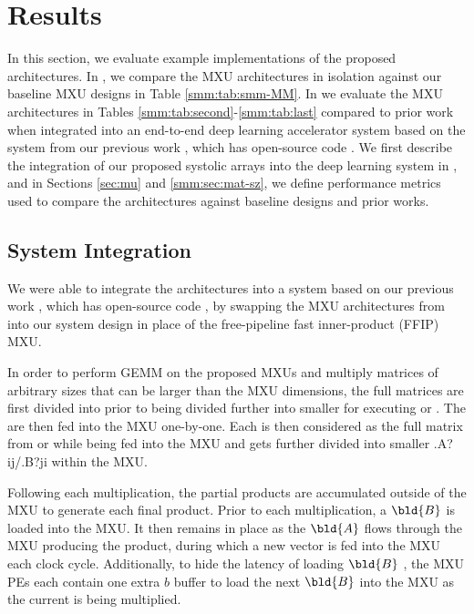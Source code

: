 \section{Results}


In this section, we evaluate example implementations of the proposed \smm architectures.
In , we compare the \smm MXU architectures in isolation against our baseline MXU designs in Table \ref{smm:tab:smm-MM}.
In  we evaluate the \smm MXU architectures in Tables \ref{smm:tab:second}-\ref{smm:tab:last} compared to prior work when integrated into an end-to-end deep learning accelerator system based on the system from our previous work \cite{pogue2024fast}, which has open-source code \cite{ffip-source}.
We first describe the integration of our proposed systolic arrays into the deep learning system in , and in Sections \ref{sec:mu} and \ref{smm:sec:mat-sz}, we define performance metrics used to compare the \smmArch architectures against baseline designs and prior works.

\subsection{System Integration}
\label{sec:system}
We were able to integrate the \smm architectures into a system based on our previous work \cite{pogue2024fast}, which has open-source code \cite{ffip-source}, by swapping the \smmArch MXU architectures from  into our system design \cite{pogue2024fast} in place of the free-pipeline fast inner-product (FFIP) MXU.

In order to perform GEMM on the proposed MXUs and multiply matrices of arbitrary sizes that can be larger than the MXU dimensions, the full \AB matrices are first divided into \gemmtiles prior to being divided further into smaller \blocks for executing  or \seq.
The \gemmtiles are then fed into the MXU one-by-one.
Each \gemmtile is then considered as the full \AB matrix from  or \seq while being fed into the MXU and gets further divided into smaller \m.A?{ij}/\m.B?{ji} \blocks within the MXU.

Following each \gemmtile multiplication, the partial \gemmtile products are accumulated outside of the MXU to generate each final \gemmtile product.
Prior to each \gemmtile multiplication, a $\bld{B}$ \gemmtile is loaded into the MXU.
It then remains in place as the $\bld{A}$ \gemmtile flows through the MXU producing the \gemmtile product, during which a new \Av vector is fed into the MXU each clock cycle.
Additionally, to hide the latency of loading $\bld{B}$ \gemmtiles, the MXU PEs each contain one extra $b$ buffer to load the next $\bld{B}$ \gemmtile into the MXU as the current \gemmtile is being multiplied.

